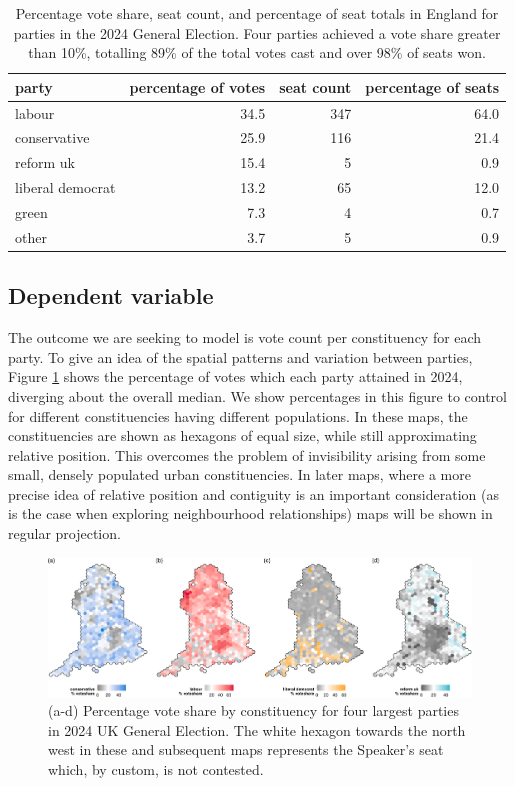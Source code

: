 \documentclass[webpdf,large,contemporary,namedate]{oup-authoring-template}
\theoremstyle{thmstyleone}
\theoremstyle{thmstyletwo}
\theoremstyle{thmstylethree}
\begin{document}
\begin{table}

\caption{\label{tab:elecsummary}Percentage vote share, seat count, and percentage of seat totals in England for parties in the 2024 General Election. Four parties achieved a vote share greater than 10\%, totalling 89\% of the total votes cast and over 98\% of seats won.}
\centering
\begin{tabular}[t]{l|r|r|r}
\hline
party & percentage of votes & seat count & percentage of seats\\
\hline
labour & 34.5 & 347 & 64.0\\
\hline
conservative & 25.9 & 116 & 21.4\\
\hline
reform uk & 15.4 & 5 & 0.9\\
\hline
liberal democrat & 13.2 & 65 & 12.0\\
\hline
green & 7.3 & 4 & 0.7\\
\hline
other & 3.7 & 5 & 0.9\\
\hline
\end{tabular}
\end{table}

\subsection{Dependent variable}\label{dependent-variable}

The outcome we are seeking to model is vote count per constituency for
each party. To give an idea of the spatial patterns and variation
between parties, Figure \ref{fig:figvoteshare} shows the percentage of
votes which each party attained in 2024, diverging about the overall
median. We show percentages in this figure to control for different
constituencies having different populations. In these maps, the
constituencies are shown as hexagons of equal size, while still
approximating relative position. This overcomes the problem of
invisibility arising from some small, densely populated urban
constituencies. In later maps, where a more precise idea of relative
position and contiguity is an important consideration (as is the case
when exploring neighbourhood relationships) maps will be shown in
regular projection.

\begin{figure}[th]
\includegraphics[width=1\linewidth]{jrss_resubmission_files/figure-latex/figvoteshare-1} \caption{(a-d) Percentage vote share by constituency for four largest parties in 2024 UK General Election. The white hexagon towards the north west in these and subsequent maps represents the Speaker's seat which, by custom, is not contested.}\label{fig:figvoteshare}
\end{figure}
\end{document}
